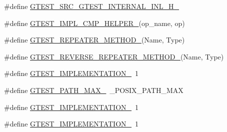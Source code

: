 \begin{DoxyCompactItemize}
\#define \hyperlink{fused-src_2gtest_2gtest-all_8cc_ab740e029f81d48cfba1b34cecce63fef}{\-G\-T\-E\-S\-T\-\_\-\-S\-R\-C\-\_\-\-G\-T\-E\-S\-T\-\_\-\-I\-N\-T\-E\-R\-N\-A\-L\-\_\-\-I\-N\-L\-\_\-\-H\-\_\-}
\item 
\#define \hyperlink{fused-src_2gtest_2gtest-all_8cc_a4a5b6fbde5dd05e05dd6846ac5e5c18e}{\-G\-T\-E\-S\-T\-\_\-\-I\-M\-P\-L\-\_\-\-C\-M\-P\-\_\-\-H\-E\-L\-P\-E\-R\-\_\-}(op\-\_\-name, op)
\item 
\#define \hyperlink{fused-src_2gtest_2gtest-all_8cc_a87a475ab9e81de8b49525787665b9229}{\-G\-T\-E\-S\-T\-\_\-\-R\-E\-P\-E\-A\-T\-E\-R\-\_\-\-M\-E\-T\-H\-O\-D\-\_\-}(\-Name, \-Type)
\item 
\#define \hyperlink{fused-src_2gtest_2gtest-all_8cc_aa7da32fd7da6a8cceeed6b448cb7b5f2}{\-G\-T\-E\-S\-T\-\_\-\-R\-E\-V\-E\-R\-S\-E\-\_\-\-R\-E\-P\-E\-A\-T\-E\-R\-\_\-\-M\-E\-T\-H\-O\-D\-\_\-}(\-Name, \-Type)
\item 
\#define \hyperlink{fused-src_2gtest_2gtest-all_8cc_a83bd232fd1077579fada92c31bb7469f}{\-G\-T\-E\-S\-T\-\_\-\-I\-M\-P\-L\-E\-M\-E\-N\-T\-A\-T\-I\-O\-N\-\_\-}~1
\item 
\#define \hyperlink{fused-src_2gtest_2gtest-all_8cc_ad9d445747785a9271a57cf1d392b89ad}{\-G\-T\-E\-S\-T\-\_\-\-P\-A\-T\-H\-\_\-\-M\-A\-X\-\_\-}~\-\_\-\-P\-O\-S\-I\-X\-\_\-\-P\-A\-T\-H\-\_\-\-M\-A\-X
\item 
\#define \hyperlink{fused-src_2gtest_2gtest-all_8cc_a83bd232fd1077579fada92c31bb7469f}{\-G\-T\-E\-S\-T\-\_\-\-I\-M\-P\-L\-E\-M\-E\-N\-T\-A\-T\-I\-O\-N\-\_\-}~1
\item 
\#define \hyperlink{fused-src_2gtest_2gtest-all_8cc_a83bd232fd1077579fada92c31bb7469f}{\-G\-T\-E\-S\-T\-\_\-\-I\-M\-P\-L\-E\-M\-E\-N\-T\-A\-T\-I\-O\-N\-\_\-}~1
\end{DoxyCompactItemize}

